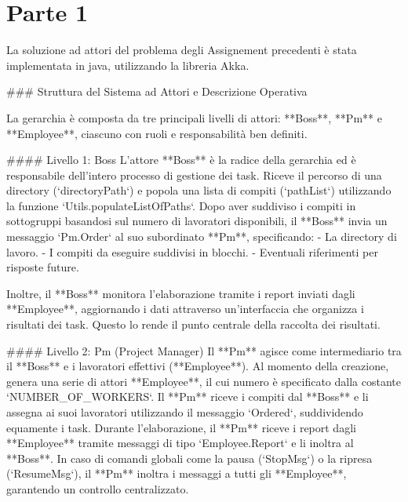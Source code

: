 \chapter{Parte 1}
\label{ch:into} %

La soluzione ad attori del problema degli Assignement precedenti è stata implementata in java, utilizzando la libreria Akka.

### Struttura del Sistema ad Attori e Descrizione Operativa

La gerarchia è composta da tre principali livelli di attori: **Boss**, **Pm** e **Employee**, ciascuno con ruoli e responsabilità ben definiti.  

#### Livello 1: Boss  
L'attore **Boss** è la radice della gerarchia ed è responsabile dell'intero processo di gestione dei task. Riceve il percorso di una directory (`directoryPath`) e popola una lista di compiti (`pathList`) utilizzando la funzione `Utils.populateListOfPaths`. Dopo aver suddiviso i compiti in sottogruppi basandosi sul numero di lavoratori disponibili, il **Boss** invia un messaggio `Pm.Order` al suo subordinato **Pm**, specificando:
- La directory di lavoro.
- I compiti da eseguire suddivisi in blocchi.
- Eventuali riferimenti per risposte future.  

Inoltre, il **Boss** monitora l'elaborazione tramite i report inviati dagli **Employee**, aggiornando i dati attraverso un’interfaccia che organizza i risultati dei task. Questo lo rende il punto centrale della raccolta dei risultati.

#### Livello 2: Pm (Project Manager)  
Il **Pm** agisce come intermediario tra il **Boss** e i lavoratori effettivi (**Employee**). Al momento della creazione, genera una serie di attori **Employee**, il cui numero è specificato dalla costante `NUMBER_OF_WORKERS`. Il **Pm** riceve i compiti dal **Boss** e li assegna ai suoi lavoratori utilizzando il messaggio `Ordered`, suddividendo equamente i task.  
Durante l'elaborazione, il **Pm** riceve i report dagli **Employee** tramite messaggi di tipo `Employee.Report` e li inoltra al **Boss**.  
In caso di comandi globali come la pausa (`StopMsg`) o la ripresa (`ResumeMsg`), il **Pm** inoltra i messaggi a tutti gli **Employee**, garantendo un controllo centralizzato.

